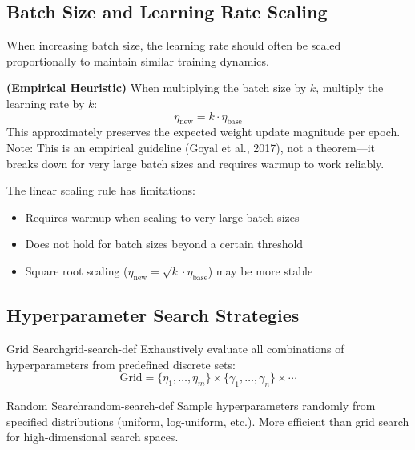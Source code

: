\documentclass[../../main.tex]{subfiles}
\begin{document}
\subsection{Batch Size and Learning Rate Scaling}

When increasing batch size, the learning rate should often be scaled proportionally to maintain similar training dynamics.

\begin{principle}[title=Linear Scaling Rule]
\textbf{(Empirical Heuristic)} When multiplying the batch size by $k$, multiply the learning rate by $k$:
\[
    \eta_{\text{new}} = k \cdot \eta_{\text{base}}
\]
This approximately preserves the expected weight update magnitude per epoch. Note: This is an empirical guideline (Goyal et al., 2017), not a theorem---it breaks down for very large batch sizes and requires warmup to work reliably.
\end{principle}

\begin{important}
The linear scaling rule has limitations:
\begin{itemize}
    \item Requires warmup when scaling to very large batch sizes
    \item Does not hold for batch sizes beyond a certain threshold
    \item Square root scaling ($\eta_{\text{new}} = \sqrt{k} \cdot \eta_{\text{base}}$) may be more stable
\end{itemize}
\end{important}

\subsection{Hyperparameter Search Strategies}

\begin{definition}{Grid Search}{grid-search-def}
Exhaustively evaluate all combinations of hyperparameters from predefined discrete sets:
\[
    \text{Grid} = \{\eta_1, \ldots, \eta_m\} \times \{\gamma_1, \ldots, \gamma_n\} \times \cdots
\]
\end{definition}

\begin{definition}{Random Search}{random-search-def}
Sample hyperparameters randomly from specified distributions (uniform, log-uniform, etc.). More efficient than grid search for high-dimensional search spaces.
\end{definition}
\end{document}

